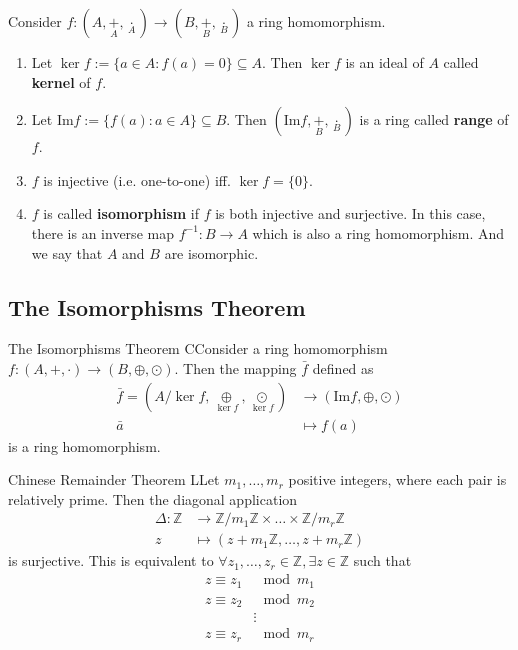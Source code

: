 \documentclass[12pt,a4paper]{article}
\begin{document}
Consider $f: (A, \underset{A}{+}, \underset{A}{\cdot}) \to (B, \underset{B}{+}, \underset{B}{\cdot})$ a ring homomorphism. 
\begin{enumerate}
\item Let $\ker f := \{ a \in A : f(a) = 0 \} \subseteq A$. Then $\ker f$ is an ideal of $A$ called \textbf{kernel} of $f$.
\item Let $\text{Im} f := \{ f(a) : a \in A \} \subseteq B$. Then $(\text{Im} f, \underset{B}{+}, \underset{B}{\cdot})$ is a ring called \textbf{range} of $f$.
\item $f$ is injective (i.e. one-to-one) iff. $\ker f = \{ 0 \}$.
\item $f$ is called \textbf{isomorphism} if $f$ is both injective and surjective. In this case, there is an inverse map $f^{-1} : B \to A$ which is also a ring homomorphism. And we say that $A$ and $B$ are isomorphic.
\end{enumerate}

\subsection{The Isomorphisms Theorem}

\begin{thm}{The Isomorphisms Theorem}
CConsider a ring homomorphism $f : (A, +, \cdot) \to (B, \oplus, \odot)$. Then the mapping $\bar{f}$ defined as
\begin{equation*}
\begin{aligned}
\bar{f} = (A/ \ker f, \underset{\ker f}{\oplus}, \underset{\ker f}{\odot}) & \to (\text{Im} f, \oplus, \odot) \\
\bar{a} & \mapsto f(a)
\end{aligned}
\end{equation*}
is a ring homomorphism.
\end{thm}

\begin{thm}{Chinese Remainder Theorem}
LLet $m_1, \ldots, m_r$ positive integers, where each pair is relatively prime. Then the diagonal application
\begin{equation*}
\begin{aligned}
\Delta : \mathbb{Z} & \to \mathbb{Z}/m_1\mathbb{Z} \times \ldots \times \mathbb{Z}/m_r \mathbb{Z} \\
z & \mapsto (z+m_1\mathbb{Z}, \ldots, z+m_r\mathbb{Z})
\end{aligned}
\end{equation*}
is surjective. This is equivalent to $\forall z_1, \ldots, z_r \in \mathbb{Z}, \exists z \in \mathbb{Z}$ such that
\begin{equation*}
\begin{aligned}
z \equiv z_1 & \mod m_1  \\
z \equiv z_2 & \mod m_2  \\
& \vdots \\
z \equiv z_r & \mod m_r  \\
\end{aligned}
\end{equation*}
\end{thm}
\end{document}
